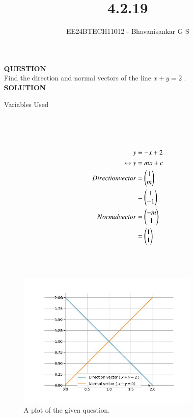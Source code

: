 \documentclass[journal]{IEEEtran}
\begin{document}

\vspace{3cm}

\title{4.2.19}
\author{EE24BTECH11012 - Bhavanisankar G S}
{\let\newpage\relax\maketitle}

\renewcommand{\thefigure}{\theenumi}
\renewcommand{\thetable}{\theenumi}
\setlength{\intextsep}{10pt} %


\renewcommand{\thetable}{\theenumi}

\textbf{QUESTION} \\
Find the direction and normal vectors of the line $x+y=2$ . \\
\textbf{SOLUTION} \\

\begin{table}[h!]
	\centering
        
	\caption{Variables Used}
	\label{tab10.5.3.9.1}
\end{table} \\ \\ \\

\begin{align}
	y &= -x + 2 \\
	\leftrightarrow y &= mx + c \\
	Direction vector &= \begin{pmatrix}1 \\ m\end{pmatrix} \\ 
	                 &= \begin{pmatrix}1 \\ -1\end{pmatrix} \\
	Normal vector &= \begin{pmatrix} -m \\ 1 \end{pmatrix} \\
	              &= \begin{pmatrix} 1 \\ 1 \end{pmatrix} \\ 
\end{align}

	 \\
	 \\
	
\begin{figure}[h]
	\centering
	\includegraphics[width=0.8\textwidth]{figs/figure.jpg}
	\caption{A plot of the given question.}
\end{figure}
\end{document}
